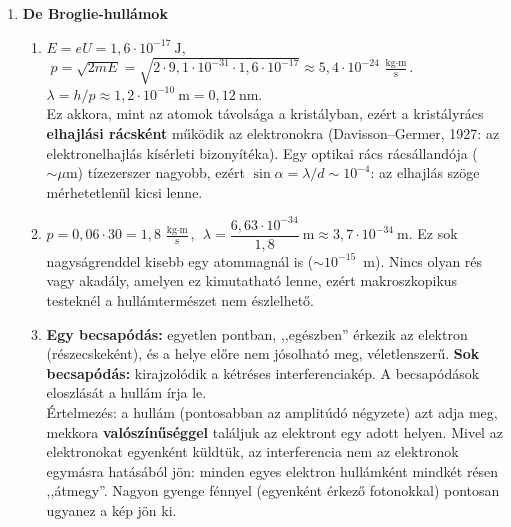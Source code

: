 \documentclass[11pt,a4paper]{article}
\begin{document}
\begin{enumerate}
\item \textbf{De Broglie-hullámok}
  \begin{enumerate}
    \item $E = eU = 1{,}6\cdot 10^{-17}~\text{J}$, $\;p = \sqrt{2mE} =
      \sqrt{2\cdot 9{,}1\cdot 10^{-31}\cdot 1{,}6\cdot 10^{-17}} \approx
      5{,}4\cdot 10^{-24}~\tfrac{\text{kg}\cdot\text{m}}{\text{s}}$.\\
      $\lambda = h/p \approx 1{,}2\cdot 10^{-10}~\text{m} = 0{,}12~\text{nm}$.\\
      Ez akkora, mint az atomok távolsága a kristályban, ezért a kristályrács
      \textbf{elhajlási rácsként} működik az elektronokra (Davisson--Germer, 1927: az
      elektronelhajlás kísérleti bizonyítéka). Egy optikai rács rácsállandója
      ($\sim\mu\text{m}$) tízezerszer nagyobb, ezért $\sin\alpha = \lambda/d \sim
      10^{-4}$: az elhajlás szöge mérhetetlenül kicsi lenne.
    \item $p = 0{,}06\cdot 30 = 1{,}8~\tfrac{\text{kg}\cdot\text{m}}{\text{s}}$,
      $\;\lambda = \dfrac{6{,}63\cdot 10^{-34}}{1{,}8}~\text{m} \approx
      3{,}7\cdot 10^{-34}~\text{m}$. Ez sok nagyságrenddel kisebb egy atommagnál is
      ($\sim 10^{-15}$~m). Nincs olyan rés vagy akadály, amelyen ez kimutatható lenne,
      ezért makroszkopikus testeknél a hullámtermészet nem észlelhető.
    \item \textbf{Egy becsapódás:} egyetlen pontban, ,,egészben'' érkezik az elektron
      (részecskeként), és a helye előre nem jósolható meg, véletlenszerű.
      \textbf{Sok becsapódás:} kirajzolódik a kétréses interferenciakép. A becsapódások
      eloszlását a hullám írja le.\\
      Értelmezés: a hullám (pontosabban az amplitúdó négyzete) azt adja meg, mekkora
      \textbf{valószínűséggel} találjuk az elektront egy adott helyen. Mivel az
      elektronokat egyenként küldtük, az interferencia nem az elektronok egymásra
      hatásából jön: minden egyes elektron hullámként mindkét résen ,,átmegy''. Nagyon
      gyenge fénnyel (egyenként érkező fotonokkal) pontosan ugyanez a kép jön ki.
  \end{enumerate}


\end{enumerate}
\end{document}

